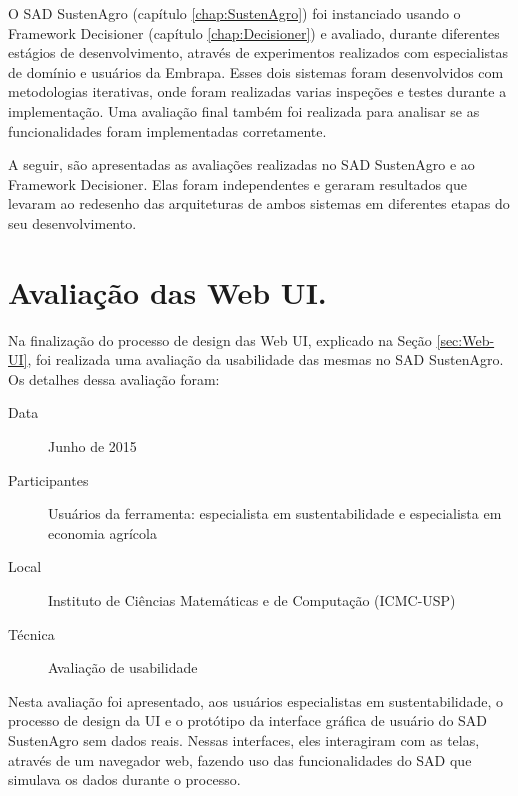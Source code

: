 O SAD SustenAgro (capítulo \ref{chap:SustenAgro}) foi instanciado
usando o Framework Decisioner (capítulo \ref{chap:Decisioner}) e
avaliado, durante diferentes estágios de desenvolvimento, através
de experimentos realizados com especialistas de domínio e usuários
da Embrapa. Esses dois sistemas foram desenvolvidos com metodologias
iterativas, onde foram realizadas varias inspeções e testes durante
a implementação. Uma avaliação final também foi realizada para analisar
se as funcionalidades foram implementadas corretamente.

A seguir, são apresentadas as avaliações realizadas no SAD SustenAgro
e ao Framework Decisioner. Elas foram independentes e geraram resultados
que levaram ao redesenho das arquiteturas de ambos sistemas em diferentes
etapas do seu desenvolvimento.

\section{Avaliação das Web UI.}

Na finalização do processo de design das Web UI, explicado na Seção
\ref{sec:Web-UI}, foi realizada uma avaliação da usabilidade das
mesmas no SAD SustenAgro. Os detalhes dessa avaliação foram:
\begin{description}
\item [{Data}] Junho de 2015
\item [{Participantes}] Usuários da ferramenta: especialista em sustentabilidade
e especialista em economia agrícola
\item [{Local}] Instituto de Ciências Matemáticas e de Computação (ICMC-USP) 
\item [{Técnica}] Avaliação de usabilidade
\end{description}
Nesta avaliação foi apresentado, aos usuários especialistas em sustentabilidade,
o processo de design da UI e o protótipo da interface gráfica de usuário
do SAD SustenAgro sem dados reais. Nessas interfaces, eles interagiram
com as telas, através de um navegador web, fazendo uso das funcionalidades
do SAD que simulava os dados durante o processo.

